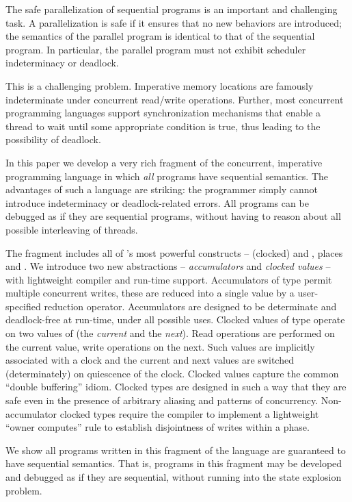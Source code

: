 
The safe parallelization of sequential programs is an important and
challenging task. A parallelization is safe if it ensures that no new
behaviors are introduced; the semantics of the parallel program is
identical to that of the sequential program. In particular, the
parallel program must not exhibit scheduler indeterminacy or deadlock.

This is a challenging problem.  Imperative memory locations are
famously indeterminate under concurrent read/write
operations. Further, most concurrent programming languages support
synchronization mechanisms that enable a thread to wait until some
appropriate condition is true, thus leading to the possibility of
deadlock.

In this paper we develop a very rich fragment of the concurrent,
imperative programming language \Xten{} in which {\em all} programs
have sequential semantics. The advantages of such a language are
striking: the programmer simply cannot introduce indeterminacy or
deadlock-related errors. All programs can be debugged as if they are
sequential programs, without having to reason about all possible
interleaving of threads.

The fragment includes all of \Xten{}'s most powerful constructs --
(clocked)  and , places and {}. We
introduce two new abstractions -- {\em accumulators} and {\em clocked
  values} -- with lightweight compiler and run-time
support. Accumulators of type  permit multiple concurrent
writes, these are reduced into a single value by a user-specified
reduction operator. Accumulators are designed to be determinate and
deadlock-free at run-time, under all possible uses.  Clocked values of
type  operate on two values of  (the {\em current} and
the {\em next}). Read operations are performed on the current value,
write operations on the next. Such values are implicitly associated
with a clock and the current and next values are switched
(determinately) on quiescence of the clock. Clocked values capture the
common ``double buffering'' idiom. Clocked types are designed in such
a way that they are safe even in the presence of arbitrary aliasing
and patterns of concurrency. Non-accumulator clocked types require the
compiler to implement a lightweight ``owner computes'' rule to
establish disjointness of writes within a phase.

We show all programs written in this fragment of the language are
guaranteed to have sequential semantics. That is, programs in this
fragment may be developed and debugged as if they are sequential,
without running into the state explosion problem.

